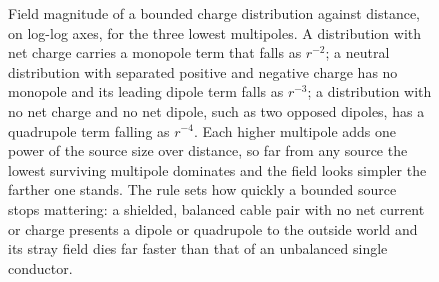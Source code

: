 \begin{figure}[htbp]
\centering
{}
\caption[Multipole falloff of a bounded charge distribution]{Field
magnitude of a bounded charge distribution against distance, on log-log
axes, for the three lowest multipoles. A distribution with net charge
carries a monopole term that falls as $r^{-2}$; a neutral distribution
with separated positive and negative charge has no monopole and its
leading dipole term falls as $r^{-3}$; a distribution with no net charge
and no net dipole, such as two opposed dipoles, has a quadrupole term
falling as $r^{-4}$. Each higher multipole adds one power of the source
size over distance, so far from any source the lowest surviving multipole
dominates and the field looks simpler the farther one stands. The rule
sets how quickly a bounded source stops mattering: a shielded, balanced
cable pair with no net current or charge presents a dipole or quadrupole
to the outside world and its stray field dies far faster than that of an
unbalanced single conductor.}
\label{fig:vol04ch08:dipole-multipole}
\end{figure}
